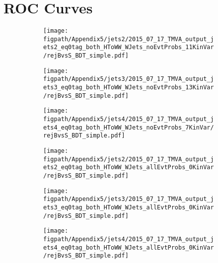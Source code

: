 \section{ROC Curves}
\label{appendix:BDT_ROC_curves}
\begin{figure}[!hbt]
    \centering
    \begin{subfigure}[t]{0.316\textwidth}
        \texttt{[image: \\figpath/Appendix5/jets2/2015\_07\_17\_TMVA\_output\_jets2\_eq0tag\_both\_HToWW\_WJets\_noEvtProbs\_11KinVar/rejBvsS\_BDT\_simple.pdf]}
        \caption{}
        \label{fig:KinBDT_ROC_jets2}
    \end{subfigure}
    \begin{subfigure}[t]{0.316\textwidth}
        \texttt{[image: \\figpath/Appendix5/jets3/2015\_07\_17\_TMVA\_output\_jets3\_eq0tag\_both\_HToWW\_WJets\_noEvtProbs\_13KinVar/rejBvsS\_BDT\_simple.pdf]}
        \caption{}
        \label{fig:KinBDT_ROC_jets3}
    \end{subfigure}
    \begin{subfigure}[t]{0.316\textwidth}
        \texttt{[image: \\figpath/Appendix5/jets4/2015\_07\_17\_TMVA\_output\_jets4\_eq0tag\_both\_HToWW\_WJets\_noEvtProbs\_7KinVar/rejBvsS\_BDT\_simple.pdf]}
        \caption{}
        \label{fig:KinBDT_ROC_jets4}
    \end{subfigure}

    \begin{subfigure}[t]{0.316\textwidth}
        \texttt{[image: \\figpath/Appendix5/jets2/2015\_07\_17\_TMVA\_output\_jets2\_eq0tag\_both\_HToWW\_WJets\_allEvtProbs\_0KinVar/rejBvsS\_BDT\_simple.pdf]}
        \caption{}
        \label{fig:MEBDT_ROC_jets2}
    \end{subfigure}
    \begin{subfigure}[t]{0.316\textwidth}
        \texttt{[image: \\figpath/Appendix5/jets3/2015\_07\_17\_TMVA\_output\_jets3\_eq0tag\_both\_HToWW\_WJets\_allEvtProbs\_0KinVar/rejBvsS\_BDT\_simple.pdf]}
        \caption{}
        \label{fig:MEBDT_ROC_jets3}
    \end{subfigure}
    \begin{subfigure}[t]{0.316\textwidth}
        \texttt{[image: \\figpath/Appendix5/jets4/2015\_07\_17\_TMVA\_output\_jets4\_eq0tag\_both\_HToWW\_WJets\_allEvtProbs\_0KinVar/rejBvsS\_BDT\_simple.pdf]}
        \caption{}
        \label{fig:MEBDT_ROC_jets4}
    \end{subfigure}


\end{figure}
